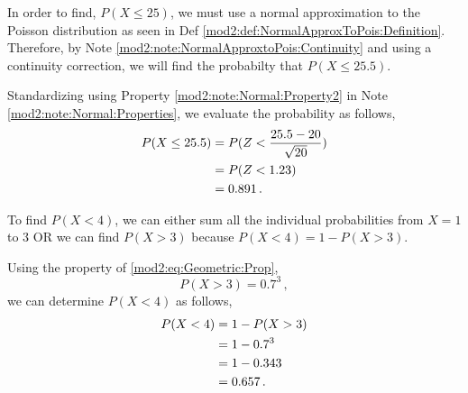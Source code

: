 \begin{subquestions}
\subquestion

In order to find, $P(X\leq 25)$, we must use a normal approximation to the Poisson distribution as seen in Def \ref{mod2:def:NormalApproxToPois:Definition}.\\

Therefore, by Note \ref{mod2:note:NormalApproxtoPois:Continuity} and using a continuity correction, we will find the probabilty that $P(X \leq 25.5)$.

Standardizing using Property \ref{mod2:note:Normal:Property2} in Note \ref{mod2:note:Normal:Properties}, we evaluate the probability as follows,
\begin{align}
	P(X \leq 25.5) &= P(Z< \frac{25.5-20}{\sqrt{20}}) \nonumber \\
	&=P(Z<1.23) \nonumber \\ 
	&=0.891 \,.
\end{align}

\subquestion

To find $P(X<4)$, we can either sum all the individual probabilities from $X=1$ to $3$ OR we can find $P(X>3)$ because $P(X<4)=1-P(X>3)$.

Using the property of \ref{mod2:eq:Geometric:Prop},
\begin{equation}
   P(X>3) = 0.7^3\,,
\end{equation}
we can determine $P(X<4)$ as follows,
\begin{align}
	P(X<4) &= 1-P(X>3) \nonumber \\
	&=1-0.7^3 \nonumber \\
	&=1-0.343 \nonumber \\
	&=0.657 \,.
\end{align}

\end{subquestions}
